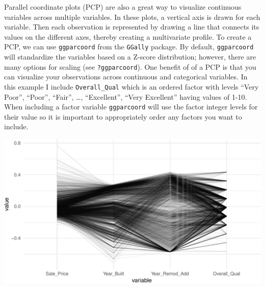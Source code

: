 \documentclass[]{article}
\newenvironment{Shaded}{\begin{snugshade}}{\end{snugshade}}
\newcommand{\KeywordTok}[1]{\textcolor[rgb]{0.13,0.29,0.53}{\textbf{#1}}}
\newcommand{\DataTypeTok}[1]{\textcolor[rgb]{0.13,0.29,0.53}{#1}}
\newcommand{\DecValTok}[1]{\textcolor[rgb]{0.00,0.00,0.81}{#1}}
\newcommand{\StringTok}[1]{\textcolor[rgb]{0.31,0.60,0.02}{#1}}
\newcommand{\OperatorTok}[1]{\textcolor[rgb]{0.81,0.36,0.00}{\textbf{#1}}}
\newcommand{\NormalTok}[1]{#1}
\begin{document}
Parallel coordinate plots (PCP) are also a great way to visualize
continuous variables across multiple variables. In these plots, a
vertical axis is drawn for each variable. Then each observation is
represented by drawing a line that connects its values on the different
axes, thereby creating a multivariate profile. To create a PCP, we can
use \texttt{ggparcoord} from the \texttt{GGally} package. By default,
\texttt{ggparcoord} will standardize the variables based on a Z-score
distribution; however, there are many options for scaling (see
\texttt{?ggparcoord}). One benefit of of a PCP is that you can visualize
your observations across continuous and categorical variables. In this
example I include \texttt{Overall\_Qual} which is an ordered factor with
levels ``Very Poor'', ``Poor'', ``Fair'', \ldots{}, ``Excellent'',
``Very Excellent'' having values of 1-10. When including a factor
variable \texttt{ggparcoord} will use the factor integer levels for
their value so it is important to appropriately order any factors you
want to include.

\begin{Shaded}
\end{Shaded}

\begin{center}\includegraphics{Chapter_3_-_Visualization_files/figure-latex/parallel1-1} \end{center}
\end{document}
